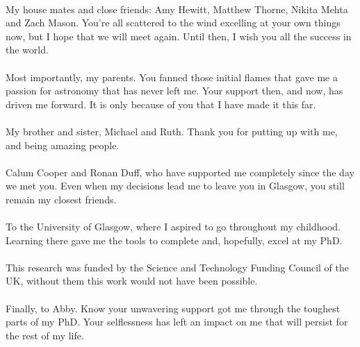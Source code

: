 \begin{acknowledgements}
\\
My house mates and close friends: Amy Hewitt, Matthew Thorne, Nikita Mehta and Zach Mason. You're all scattered to the wind excelling at your own things now, but I hope that we will meet again. Until then, I wish you all the success in the world.
\\
\\
Most importantly, my parents. You fanned those initial flames that gave me a passion for astronomy that has never left me. Your support then, and now, has driven me forward. It is only because of you that I have made it this far.
\\
\\
My brother and sister, Michael and Ruth. Thank you for putting up with me, and being amazing people.
\\
\\
Calum Cooper and Ronan Duff, who have supported me completely since the day we met you. Even when my decisions lead me to leave you in Glasgow, you still remain my closest friends.
\\
\\
To the University of Glasgow, where I aspired to go throughout my childhood. Learning there gave me the tools to complete and, hopefully, excel at my PhD.
\\
\\
This research was funded by the Science and Technology Funding Council of the UK, without them this work would not have been possible.
\\
\\
Finally, to Abby. Know your unwavering support got me through the toughest parts of my PhD. Your selflessness has left an impact on me that will persist for the rest of my life.

\end{acknowledgements}

